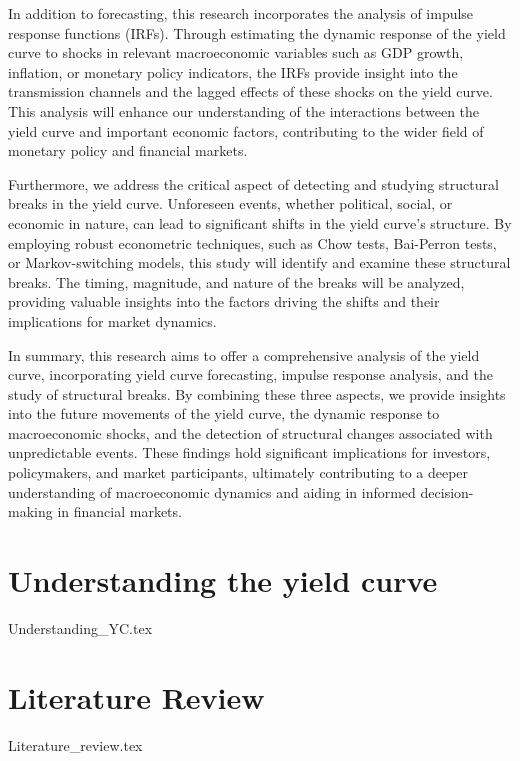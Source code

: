 \documentclass{vegaarticle}
\begin{document}
        In addition to forecasting, this research incorporates the analysis of impulse response functions (IRFs).
        Through estimating the dynamic response of the yield curve to shocks in relevant macroeconomic variables such as
        GDP growth, inflation, or monetary policy indicators, the IRFs provide insight into the transmission channels
        and the lagged effects of these shocks on the yield curve. This analysis will enhance our understanding of the
        interactions between the yield curve and important economic factors, contributing to the wider field of monetary
        policy and financial markets.
        
        Furthermore, we address the critical aspect of detecting and studying structural breaks in the yield curve.
        Unforeseen events, whether political, social, or economic in nature, can lead to significant shifts in the yield
        curve's structure. By employing robust econometric techniques, such as Chow tests, Bai-Perron tests, or
        Markov-switching models, this study will identify and examine these structural breaks. The timing, magnitude,
        and nature of the breaks will be analyzed, providing valuable insights into the factors driving the shifts and
        their implications for market dynamics.
        
        In summary, this research aims to offer a comprehensive analysis of the yield curve, incorporating yield curve
        forecasting, impulse response analysis, and the study of structural breaks. By combining these three aspects,
        we provide insights into the future movements of the yield curve, the dynamic response to macroeconomic shocks,
        and the detection of structural changes associated with unpredictable events. These findings hold significant
        implications for investors, policymakers, and market participants, ultimately contributing to a deeper
        understanding of macroeconomic dynamics and aiding in informed decision-making in financial markets.
            
    \section{Understanding the yield curve}
        {Understanding_YC.tex}

    \section{Literature Review}
        {Literature_review.tex}
\end{document}
